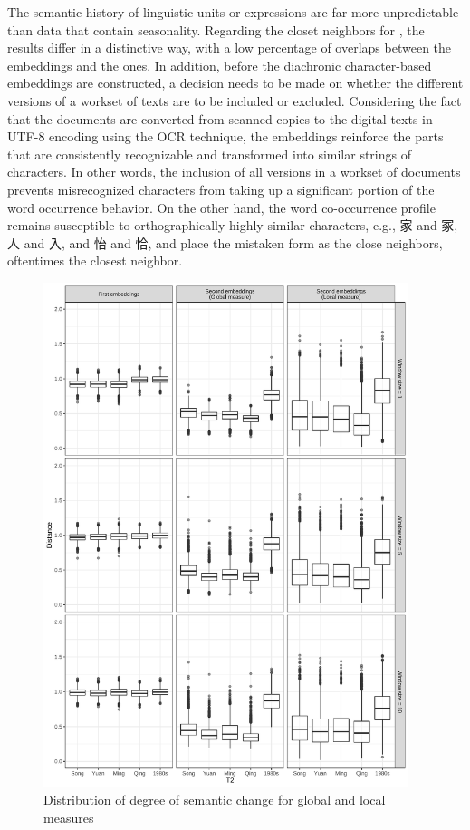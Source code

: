 The semantic history of linguistic units or expressions are far more unpredictable than data that contain seasonality. Regarding the closet neighbors for \jia , the results differ in a distinctive way, with a low percentage of overlaps between the  embeddings and the  ones. In addition, before the diachronic character-based embeddings are constructed, a decision needs to be made on whether the different versions of a workset of texts are to be included or excluded. Considering the fact that the documents are converted from scanned copies to the digital texts in UTF-8 encoding using the OCR technique, the  embeddings reinforce the parts that are consistently recognizable and transformed into similar strings of characters. In other words, the inclusion of all versions in a workset of documents prevents misrecognized characters from taking up a significant portion of the word occurrence behavior. On the other hand, the word co-occurrence profile remains susceptible to orthographically highly similar characters, e.g., 家 and 冢, 人 and 入, and 怡 and 恰, and place the mistaken form as the close neighbors, oftentimes the closest neighbor.

\newpage
\begin{figure}[H]
    \centering
    \includegraphics[width=0.95\textwidth,height=0.95\textheight,keepaspectratio]{figures_new/measures/dist_boxplot.pdf}
    \caption{Distribution of degree of semantic change for global and local measures}
\end{figure}

